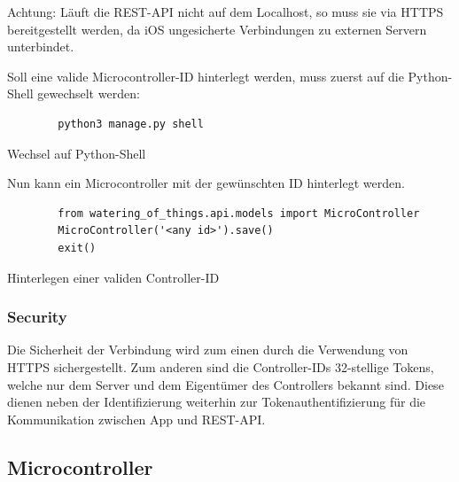     Achtung: Läuft die REST-API nicht auf dem Localhost, so muss sie via HTTPS bereitgestellt werden, da iOS ungesicherte Verbindungen zu externen Servern unterbindet.
    
    Soll eine valide Microcontroller-ID hinterlegt werden, muss zuerst auf die Python-Shell gewechselt werden:
    \begin{listing}[H]
        \begin{verbatim}
        python3 manage.py shell
        \end{verbatim}
        \caption{Wechsel auf Python-Shell}
    \end{listing}
    Nun kann ein Microcontroller mit der gewünschten ID hinterlegt werden.
    \begin{listing}[H]
        \begin{verbatim}
        from watering_of_things.api.models import MicroController
        MicroController('<any id>').save()
        exit()
        \end{verbatim}
        \caption{Hinterlegen einer validen Controller-ID}
    \end{listing}

    \subsubsection{Security}
    Die Sicherheit der Verbindung wird zum einen durch die Verwendung von HTTPS sichergestellt. Zum anderen sind die Controller-IDs 32-stellige Tokens, welche nur dem Server und dem Eigentümer des Controllers bekannt sind. Diese dienen neben der Identifizierung weiterhin zur Tokenauthentifizierung für die Kommunikation zwischen App und REST-API.
    
\subsection{Microcontroller}
